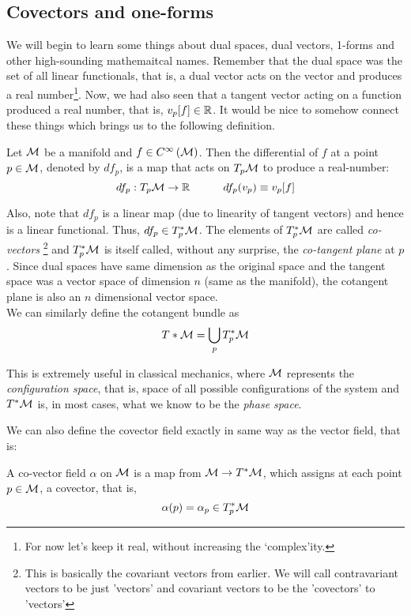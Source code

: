 \subsection{Covectors and one-forms}
We will begin to learn some things about dual spaces, dual vectors, 1-forms and other high-sounding mathemaitcal names. Remember that the dual space was the set of all linear functionals, that is, a dual vector acts on the vector and produces a real number\footnote{For now let's keep it real, without increasing the `complex'ity.}. Now, we had also seen that a tangent vector acting on a function produced a real number, that is, $v_p[f]\in \mathbb{R}$. It would be nice to somehow connect these things which brings us to the following definition. 
\begin{definition}
    Let $\mathcal M$ be a manifold and $f\in C^{\infty}\left(\mathcal M\right)$.  Then the differential of $f$ at a point $p\in\mathcal M$, denoted by $df_p$, is a map that acts on $T_p\mathcal M$ to produce a real-number:
    $$df_p:T_p\mathcal M\rightarrow \mathbb{R}\quad\quad\quad df_p(v_p) \equiv v_p[f]$$
\end{definition}
Also, note that $df_p$ is a linear map (due to linearity of tangent vectors) and hence is a linear functional. Thus, $df_p\in T_p^*\mathcal M$. The elements of $T_p^*\mathcal M$ are called \textit{co-vectors} \footnote{This is basically the covariant vectors from earlier. We will call contravariant vectors to be just 'vectors' and covariant vectors to be the 'covectors' to 'vectors'} and $T_p^*\mathcal M$ is itself called, without any surprise, the \textit{co-tangent plane} at $p$. Since dual spaces have same dimension as the original space and the tangent space was a vector space of dimension $n$ (same as the manifold), the cotangent plane is also an $n$ dimensional vector space.\\[0.2cm]
We can similarly define the cotangent bundle as 
$$T*\mathcal M = \bigcup\limits_p T^*_p\mathcal M$$
\begin{ffact}
This is extremely useful in classical mechanics, where $\mathcal M$ represents the \textit{configuration space}, that is, space of all possible configurations of the system and $T^*\mathcal M$ is, in most cases, what we know to be the \textit{phase space}.
\end{ffact}
We can also define the covector field exactly in same way as the vector field, that is:
\begin{definition}
    A co-vector field $\alpha$ on $\mathcal M$ is a map from $\mathcal M \rightarrow T^*\mathcal M$, which assigns at each point $p\in\mathcal M$, a covector, that is,
    $$\alpha(p) = \alpha_p\in T_p^*\mathcal M$$
\end{definition}

